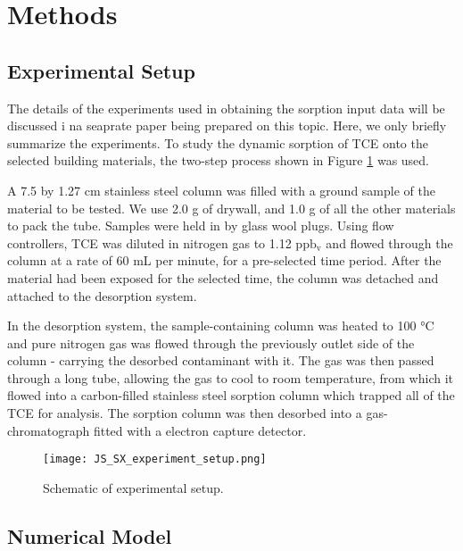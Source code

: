 \section{Methods}\label{sec:methods}

\subsection{Experimental Setup}\label{sec:experimental_method}

The details of the experiments used in obtaining the sorption input data will be discussed i na seaprate paper being prepared on this topic.
Here, we only briefly summarize the experiments.
To study the dynamic sorption of TCE onto the selected building materials, the two-step process shown in Figure \ref{fig:js_sx_setup} was used.\par

A 7.5 by 1.27 cm stainless steel column was filled with a ground sample of the material to be tested.
We use 2.0 g of drywall, and 1.0 g of all the other materials to pack the tube.
Samples were held in by glass wool plugs.
Using flow controllers, TCE was diluted in nitrogen gas to 1.12 $\mathrm{ppb_v}$ and flowed through the column at a rate of 60 mL per minute, for a pre-selected time period.
After the material had been exposed for the selected time, the column was detached and attached to the desorption system.\par

In the desorption system, the sample-containing column was heated to 100 \si{\degreeCelsius} and pure nitrogen gas was flowed through the previously outlet side of the column - carrying the desorbed contaminant with it.
The gas was then passed through a long tube, allowing the gas to cool to room temperature, from which it flowed into a carbon-filled stainless steel sorption column which trapped all of the TCE for analysis.
The sorption column was then desorbed into a gas-chromatograph fitted with a electron capture detector.\par

\begin{figure}
  \texttt{[image: JS\_SX\_experiment\_setup.png]}
  \caption{Schematic of experimental setup.}
  \label{fig:js_sx_setup}
\end{figure}

\subsection{Numerical Model}\label{sec:model}

